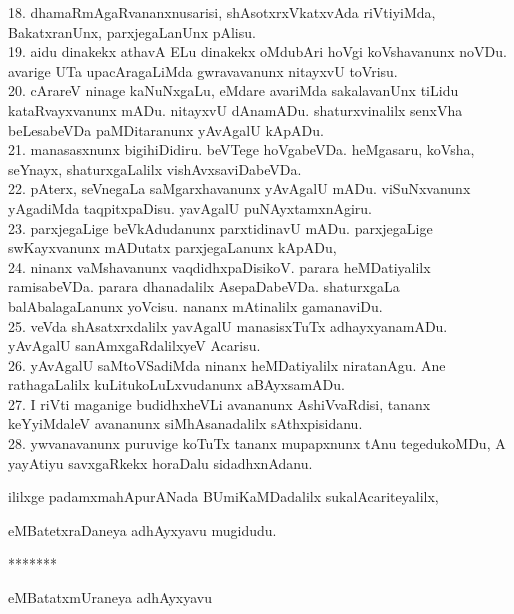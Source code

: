 \documentclass{article}
\begin{document}
18. dhamaRmAgaRvananxnusarisi, shAsotxrxVkatxvAda riVtiyiMda, BakatxranUnx, parxjegaLanUnx pAlisu.\\
19. aidu dinakekx athavA ELu dinakekx oMdubAri hoVgi koVshavanunx noVDu. avarige UTa upacAragaLiMda gwravavanunx nitayxvU toVrisu.\\
20. cArareV ninage kaNuNxgaLu, eMdare avariMda sakalavanUnx tiLidu kataRvayxvanunx mADu. nitayxvU dAnamADu. shaturxvinalilx senxVha beLesabeVDa paMDitaranunx yAvAgalU kApADu.\\
21. manasasxnunx bigihiDidiru. beVTege hoVgabeVDa. heMgasaru, koVsha, seYnayx, shaturxgaLalilx vishAvxsaviDabeVDa.\\
22. pAterx, seVnegaLa saMgarxhavanunx yAvAgalU mADu. viSuNxvanunx yAgadiMda taqpitxpaDisu. yavAgalU puNAyxtamxnAgiru.\\
23. parxjegaLige beVkAdudanunx parxtidinavU mADu. parxjegaLige swKayxvanunx mADutatx parxjegaLanunx kApADu,\\
24. ninanx vaMshavanunx vaqdidhxpaDisikoV. parara heMDatiyalilx ramisabeVDa. parara dhanadalilx AsepaDabeVDa. shaturxgaLa balAbalagaLanunx yoVcisu. nananx mAtinalilx gamanaviDu.\\
25. veVda shAsatxrxdalilx yavAgalU manasisxTuTx adhayxyanamADu. yAvAgalU sanAmxgaRdalilxyeV Acarisu.\\
26. yAvAgalU saMtoVSadiMda ninanx heMDatiyalilx niratanAgu. Ane rathagaLalilx kuLitukoLuLxvudanunx aBAyxsamADu.\\
27. I riVti maganige budidhxheVLi avananunx AshiVvaRdisi, tananx keYyiMdaleV avananunx siMhAsanadalilx sAthxpisidanu.\\
28. ywvanavanunx puruvige koTuTx tananx mupapxnunx tAnu tegedukoMDu, A yayAtiyu savxgaRkekx horaDalu sidadhxnAdanu.\\

\begin{center}
ililxge padamxmahApurANada BUmiKaMDadalilx sukalAcariteyalilx,
\end{center}

\begin{center}
eMBatetxraDaneya adhAyxyavu mugidudu.
\end{center}

\begin{center}
*******
\end{center}

\begin{center}
eMBatatxmUraneya adhAyxyavu
\end{center}
\end{document}
